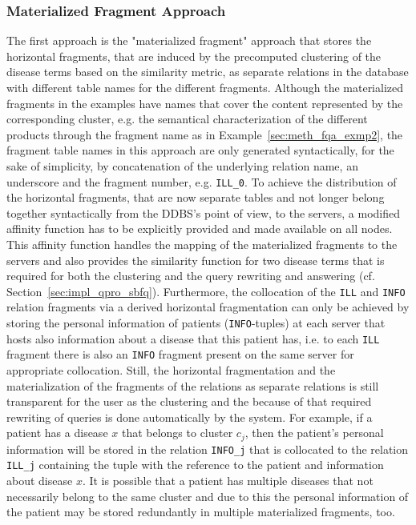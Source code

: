 \subsubsection{Materialized Fragment Approach}
\label{sec:impl_alter_mater}
The first approach is the "materialized fragment" approach that stores the horizontal fragments, that are induced by the precomputed clustering of the disease
terms based on the similarity metric, as separate relations in the database with different table names for the different fragments. Although the materialized
fragments in the examples have names that cover the content represented by the corresponding cluster, e.g. the semantical characterization of the different
products through the fragment name as in Example~\ref{sec:meth_fqa_exmp2}, the fragment table names in this approach are only generated syntactically, for the
sake of simplicity, by concatenation of the underlying relation name, an underscore and the fragment number, e.g. \verb!ILL_0!. To achieve the distribution of
the horizontal fragments, that are now separate tables and not longer belong together syntactically from the DDBS's point of view, to the servers, a modified
affinity function has to be explicitly provided and made available on all nodes. This affinity function handles the mapping of the materialized fragments to 
the servers and also provides the similarity function for two disease terms that is required for both the clustering and the query rewriting and answering 
(cf. Section~\ref{sec:impl_qpro_sbfq}). Furthermore, the collocation of the \verb!ILL! and \verb!INFO! relation fragments via a derived horizontal 
fragmentation can only be achieved by storing the personal information of patients (\verb!INFO!-tuples) at each server that hosts also information about a
disease that this patient has, i.e. to each \verb!ILL! fragment there is also an \verb!INFO! fragment present on the same server for appropriate collocation.
Still, the horizontal fragmentation and the materialization of the fragments of the relations as separate relations is still transparent for the user as the
clustering and the because of that required rewriting of queries is done automatically by the system. For example, if a patient has a disease $x$ that belongs 
to cluster $c_j$, then the patient's personal information will be stored in the relation \verb!INFO_j! that is collocated to the relation \verb!ILL_j!
containing the tuple with the reference to the patient and information about disease $x$. It is possible that a patient has multiple diseases that not 
necessarily belong to the same cluster and due to this the personal information of the patient may be stored redundantly in multiple materialized 
fragments, too.


